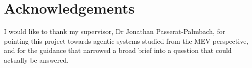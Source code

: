 \chapter*{Acknowledgements}

I would like to thank my supervisor, Dr Jonathan Passerat-Palmbach, for pointing this
project towards agentic systems studied from the MEV perspective, and for the guidance that
narrowed a broad brief into a question that could actually be answered.
